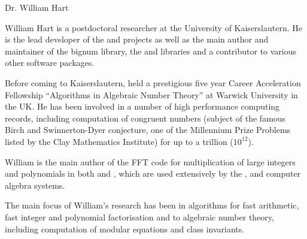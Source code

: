 \begin{participant}[type=PI,gender=male]{Dr. William Hart}

William Hart is a postdoctoral researcher at the University of
Kaiserslautern. He is the lead developer of the 
 and  projects
as well as the main author and maintainer of the  bignum library, the
 and  libraries and a contributor to various 
other software packages.

Before coming to Kaiserslautern, held a prestigious five year Career
Acceleration Fellowship ``Algorithms in Algebraic Number Theory'' at Warwick
University in the UK. He has been involved in a number of high performance
computing records, including computation of congruent numbers (subject of the
famous Birch and Swinnerton-Dyer conjecture, one of the Millennium Prize Problems 
listed by the Clay Mathematics Institute) for up to a trillion ($10^{12}$).

William is the main author of the FFT code for multiplication of large integers
and polynomials in both  and , which are used 
extensively by the \Sage,
\Singular and  computer algebra systems.

The main focus of William's research has been in algorithms for fast arithmetic, 
fast integer and polynomial factorisation and to algebraic number theory,
including computation of modular equations and class invariants.
\end{participant}
